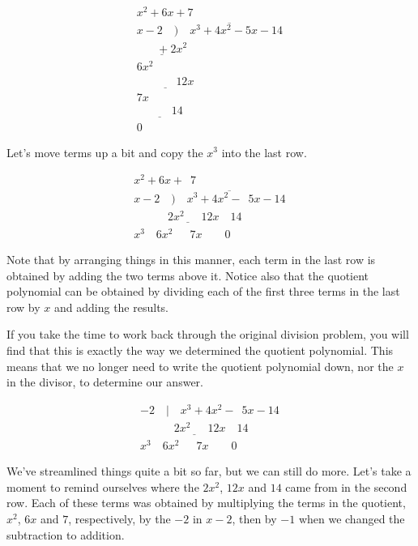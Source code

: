 \documentclass{ximera}
\begin{document}
\[
\begin{array}{r}
 x^2 + 6x + 7 \\
 x - 2 \quad \overline{)\quad x^3 + 4x^2 - 5x - 14 \,} \\
 \underline{\phantom{-x^3}   + 2x^2} \phantom{- 5x - 14} \\
 6x^2 \phantom{- 5x - 14} \\
 \underline{\phantom{-6x^2 +} 12x} \phantom{- 14} \\
 7x \phantom{- 14} \\
 \underline{\phantom{-7x +} 14} \\
 0
\end{array}
\]

Let's move terms up a bit and copy the $x^3$ into the last row.


\[
\begin{array}{r}
 x^2 + 6x + \phantom{7}7 \\
 x - 2 \quad \overline{)\quad x^3 + 4x^2 - \phantom{7}5x - 14 \,} \\
 \underline{\phantom{-x^3 +} 2x^2 \phantom{777} 12x \quad 14}\\
 x^3 \quad 6x^2 \quad \phantom{7}7x \quad\quad 0
 
\end{array}
\]

Note that by arranging things in this manner, each term in the last row is obtained by adding the two terms above it.  Notice also that the quotient polynomial can be obtained by dividing each of the first three terms in the last row by $x$ and adding the results.   

If you take the time to work back through the original division problem, you will find that this is exactly the way we determined the quotient polynomial.  This means that we no longer need to write the quotient polynomial down, nor the $x$ in the divisor, to determine our answer.

\[
\begin{array}{r}
 - 2 \quad | \quad x^3 + 4x^2 - \phantom{7}5x - 14 \, \\
 \underline{\phantom{-x^3 +} 2x^2 \phantom{777} 12x \quad 14}\\
 x^3 \quad 6x^2 \quad \phantom{7}7x \quad\quad 0
 
\end{array}
\]

We've streamlined things quite a bit so far, but we can still do more.  Let's take a moment to remind ourselves where the $2x^2$, $12x$ and $14$ came from in the second row.  Each of these terms was obtained by multiplying the terms in the quotient, $x^2$, $6x$ and $7$, respectively, by the $-2$ in $x-2$,  then by $-1$ when we changed the subtraction to addition. 
\end{document}
